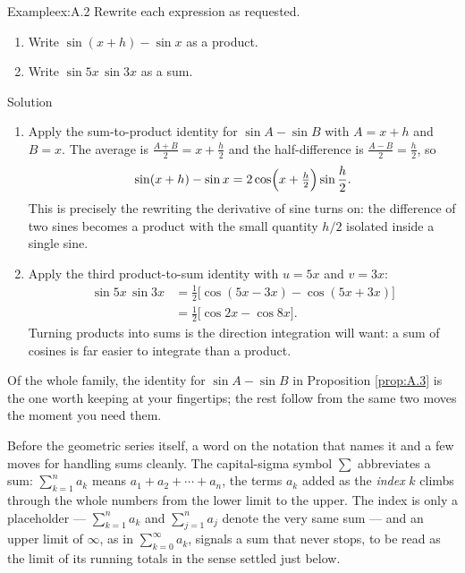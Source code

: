 \documentclass[a4paper,12pt,oneside]{memoir}
\begin{document}
\begin{workedexample}
\begin{envexample}{Example}{ex:A.2}{}
Rewrite each expression as requested.

\begin{enumerate}
  \item Write \(\sin(x + h) - \sin x\) as a product.
  \item Write \(\sin 5x \, \sin 3x\) as a sum.
\end{enumerate}
\end{envexample}
\begin{envsolution}{Solution}{}{}
\begin{enumerate}
  \item Apply the sum-to-product identity for \(\sin A - \sin B\) with \(A = x + h\) and \(B = x\). The average is \(\tfrac{A+B}{2} = x + \tfrac{h}{2}\) and the half-difference is \(\tfrac{A-B}{2} = \tfrac{h}{2}\), so \[ \sin(x + h) - \sin x = 2 \cos\Bigl(x + \tfrac{h}{2}\Bigr) \sin\frac{h}{2}. \] This is precisely the rewriting the derivative of sine turns on: the difference of two sines becomes a product with the small quantity \(h/2\) isolated inside a single sine.
  \item Apply the third product-to-sum identity with \(u = 5x\) and \(v = 3x\): \[ \begin{aligned} \sin 5x \, \sin 3x &= \tfrac{1}{2}\bigl[\cos(5x - 3x) - \cos(5x + 3x)\bigr] \\ &= \tfrac{1}{2}\bigl[\cos 2x - \cos 8x\bigr]. \end{aligned} \] Turning products into sums is the direction integration will want: a sum of cosines is far easier to integrate than a product.
\end{enumerate}
\end{envsolution}
\end{workedexample}
Of the whole family, the identity for \(\sin A - \sin B\) in Proposition \ref{prop:A.3} is the one worth keeping at your fingertips; the rest follow from the same two moves the moment you need them.


Before the geometric series itself, a word on the notation that names it and a few moves for handling sums cleanly. The capital-sigma symbol \(\sum\) abbreviates a sum: \(\sum_{k=1}^{n} a_{k}\) means \(a_{1} + a_{2} + \cdots + a_{n}\), the terms \(a_{k}\) added as the \emph{index} \(k\) climbs through the whole numbers from the lower limit to the upper. The index is only a placeholder — \(\sum_{k=1}^{n} a_{k}\) and \(\sum_{j=1}^{n} a_{j}\) denote the very same sum — and an upper limit of \(\infty\), as in \(\sum_{k=0}^{\infty} a_{k}\), signals a sum that never stops, to be read as the limit of its running totals in the sense settled just below.
\end{document}
